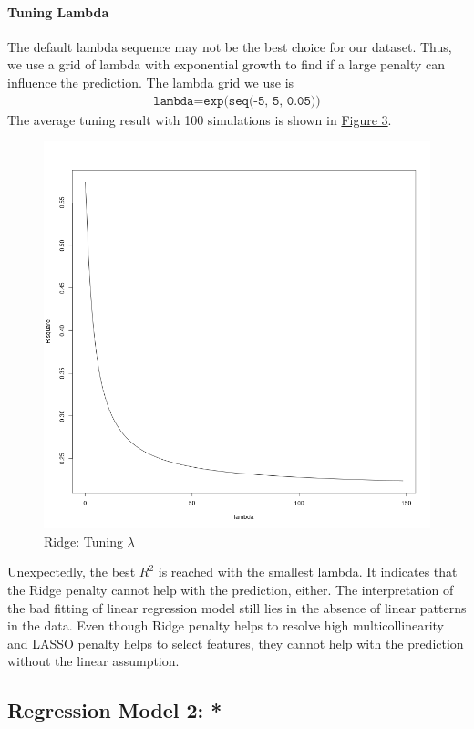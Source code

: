 \documentclass{article}
\begin{document}
\paragraph{Tuning Lambda}
The default lambda sequence may not be the best choice for our dataset.
Thus, we use a grid of lambda with exponential growth to find 
if a large penalty can influence the prediction. The lambda grid we use is 
\begin{align*}
    \texttt{lambda} = \texttt{exp(seq(-5, 5, 0.05))}
\end{align*}
The average tuning result with 100 simulations is shown in \hyperref[fig:lambda]{Figure 3}.
\begin{figure}[H]
    \centering
    \includegraphics*[scale=0.25]{figures/lambda.png}
    \caption{Ridge: Tuning $\lambda$}
\label{fig:lambda}
\end{figure}
Unexpectedly, the best $R^2$ is reached with the smallest lambda. 
It indicates that the Ridge penalty cannot help with the prediction, either. 
The interpretation of the bad fitting of linear regression model still lies in the absence of linear patterns in the data.
Even though Ridge penalty helps to resolve high multicollinearity and LASSO penalty 
helps to select features, they cannot help with the prediction without the linear assumption.

\subsection{Regression Model 2: *}
\end{document}
